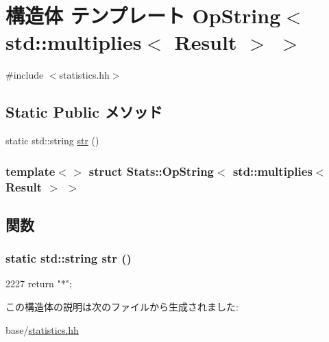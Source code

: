 \hypertarget{structStats_1_1OpString_3_01std_1_1multiplies_3_01Result_01_4_01_4}{
\section{構造体 テンプレート OpString$<$ std::multiplies$<$ Result $>$ $>$}
\label{structStats_1_1OpString_3_01std_1_1multiplies_3_01Result_01_4_01_4}
}


{\ttfamily \#include $<$statistics.hh$>$}\subsection*{Static Public メソッド}
\begin{DoxyCompactItemize}
\item 
static std::string \hyperlink{structStats_1_1OpString_3_01std_1_1multiplies_3_01Result_01_4_01_4_ac257b778f78be168137f5dc30893349b}{str} ()
\end{DoxyCompactItemize}
\subsubsection*{template$<$$>$ struct Stats::OpString$<$ std::multiplies$<$ Result $>$ $>$}



\subsection{関数}
\hypertarget{structStats_1_1OpString_3_01std_1_1multiplies_3_01Result_01_4_01_4_ac257b778f78be168137f5dc30893349b}{
\subsubsection[{str}]{\setlength{\rightskip}{0pt plus 5cm}static std::string str ()}}
\label{structStats_1_1OpString_3_01std_1_1multiplies_3_01Result_01_4_01_4_ac257b778f78be168137f5dc30893349b}



\begin{DoxyCode}
2227 { return "*"; }
\end{DoxyCode}


この構造体の説明は次のファイルから生成されました:\begin{DoxyCompactItemize}
\item 
base/\hyperlink{statistics_8hh}{statistics.hh}\end{DoxyCompactItemize}
